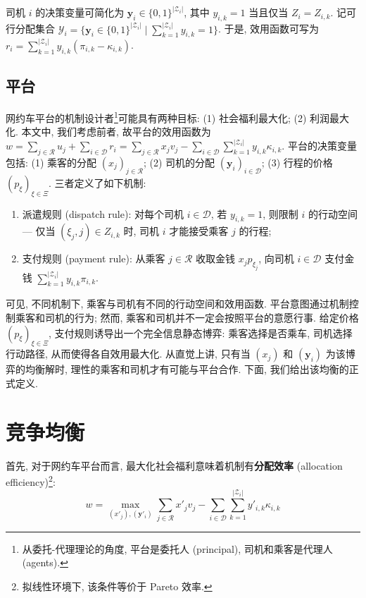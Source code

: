 \documentclass[10pt,twocolumn]{article}
\begin{document}
司机 $i$ 的决策变量可简化为 $\mathbf{y}_i \in \{0,1\}^{|\mathcal{Z}_i|}$, 其中 $y_{i,k} = 1$ 当且仅当 $Z_i = Z_{i,k}$. 记可行分配集合 $\mathcal{Y}_i = \{\mathbf{y}_i \in \{0,1\}^{|\mathcal{Z}_i|} \mid \sum_{k=1}^{|\mathcal{Z}_i|} y_{i,k} = 1\}$. 于是, 效用函数可写为 $r_i = \sum_{k=1}^{|\mathcal{Z}_i|} y_{i,k} (\pi_{i,k}-\kappa_{i,k})$.

\subsection{平台}

网约车平台的机制设计者\footnote{从委托-代理理论的角度, 平台是委托人 (principal), 司机和乘客是代理人 (agents).}可能具有两种目标: (1) 社会福利最大化; (2) 利润最大化. 本文中, 我们考虑前者, 故平台的效用函数为 $w = \sum_{j\in\mathcal{R}} u_j + \sum_{i\in\mathcal{D}} r_i = \sum_{j\in\mathcal{R}} x_j v_j - \sum_{i\in\mathcal{D}}\sum_{k=1}^{|\mathcal{Z}_i|} y_{i,k} \kappa_{i,k}$. 平台的决策变量包括: (1) 乘客的分配 $(x_j)_{j\in\mathcal{R}}$; (2) 司机的分配 $(\mathbf{y}_i)_{i\in\mathcal{D}}$; (3) 行程的价格 $(p_\xi)_{\xi\in\Xi}$. 三者定义了如下机制:

\begin{enumerate}[label=(\arabic*)]
  \item 派遣规则 (dispatch rule): 对每个司机 $i\in\mathcal{D}$, 若 $y_{i,k} = 1$, 则限制 $i$ 的行动空间 --- 仅当 $(\xi_j, j) \in Z_{i,k}$ 时, 司机 $i$ 才能接受乘客 $j$ 的行程;
  \item 支付规则 (payment rule): 从乘客 $j\in\mathcal{R}$ 收取金钱 $x_j p_{\xi_j}$, 向司机 $i\in\mathcal{D}$ 支付金钱 $\sum_{k=1}^{|\mathcal{Z}_i|} y_{i,k} \pi_{i,k}$.
\end{enumerate}

可见, 不同机制下, 乘客与司机有不同的行动空间和效用函数. 平台意图通过机制控制乘客和司机的行为; 然而, 乘客和司机并不一定会按照平台的意愿行事. 给定价格 $(p_\xi)_{\xi\in\Xi}$, 支付规则诱导出一个完全信息静态博弈: 乘客选择是否乘车, 司机选择行动路径, 从而使得各自效用最大化. 从直觉上讲, 只有当 $(x_j)$ 和 $(\mathbf{y}_i)$ 为该博弈的均衡解时, 理性的乘客和司机才有可能与平台合作. 下面, 我们给出该均衡的正式定义.

\section{竞争均衡}

首先, 对于网约车平台而言, 最大化社会福利意味着机制有\textbf{分配效率} (allocation efficiency)\footnote{拟线性环境下, 该条件等价于 Pareto 效率.}:
$$
  w = \max_{(x'_j), (\mathbf{y}'_i)} \sum_{j\in\mathcal{R}} x'_j v_j - \sum_{i\in\mathcal{D}}\sum_{k=1}^{|\mathcal{Z}_i|} y'_{i,k} \kappa_{i,k}
$$
\end{document}
